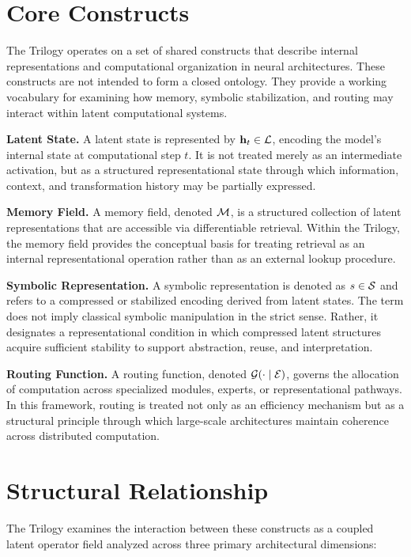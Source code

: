 \section*{Core Constructs}

The Trilogy operates on a set of shared constructs that describe internal representations and computational organization in neural architectures. These constructs are not intended to form a closed ontology. They provide a working vocabulary for examining how memory, symbolic stabilization, and routing may interact within latent computational systems.

\textbf{Latent State.}
A latent state is represented by $\mathbf{h}_t \in \mathcal{L}$, encoding the model's internal state at computational step $t$. It is not treated merely as an intermediate activation, but as a structured representational state through which information, context, and transformation history may be partially expressed.

\textbf{Memory Field.}
A memory field, denoted $\mathcal{M}$, is a structured collection of latent representations that are accessible via differentiable retrieval. Within the Trilogy, the memory field provides the conceptual basis for treating retrieval as an internal representational operation rather than as an external lookup procedure.

\textbf{Symbolic Representation.}
A symbolic representation is denoted as $s \in \mathcal{S}$ and refers to a compressed or stabilized encoding derived from latent states. The term does not imply classical symbolic manipulation in the strict sense. Rather, it designates a representational condition in which compressed latent structures acquire sufficient stability to support abstraction, reuse, and interpretation.

\textbf{Routing Function.}
A routing function, denoted $\mathcal{G}\!\left(\cdot \mid \mathcal{E}\right)$, governs the allocation of computation across specialized modules, experts, or representational pathways. In this framework, routing is treated not only as an efficiency mechanism but as a structural principle through which large-scale architectures maintain coherence across distributed computation.

\section*{Structural Relationship}
The Trilogy examines the interaction between these constructs as a coupled latent operator field analyzed across three primary architectural dimensions:

